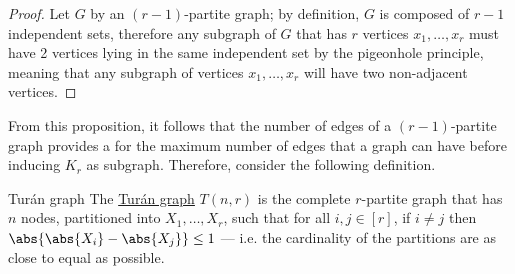\documentclass[a4paper, 12pt]{report}
\begin{document}
    \begin{proof}
        Let $G$ by an $(r-1)$-partite graph; by definition, $G$ is composed of $r - 1$ independent sets, therefore any subgraph of $G$ that has $r$ vertices $x_1, \ldots, x_r$ must have 2 vertices lying in the same independent set by the pigeonhole principle, meaning that any subgraph of vertices $x_1, \ldots, x_r$ will have two non-adjacent vertices.
    \end{proof}

    From this proposition, it follows that the number of edges of a  $(r - 1)$-partite graph provides a  for the maximum number of edges that a graph can have before inducing $K_r$ as subgraph. Therefore, consider the following definition.

    \begin{frameddefn}{Turán graph}
        The \href{https://en.wikipedia.org/wiki/Tur%C3%A1n_graph}{Turán graph} $T(n, r)$ is the complete $r$-partite graph that has $n$ nodes, partitioned into $X_1, \ldots, X_r$, such that for all $i, j \in [r]$, if $i \neq j$ then $\abs{\abs{X_i} - \abs{X_j}} \le 1$ --- i.e. the cardinality of the partitions are as close to equal as possible.
    \end{frameddefn}
\end{document}
